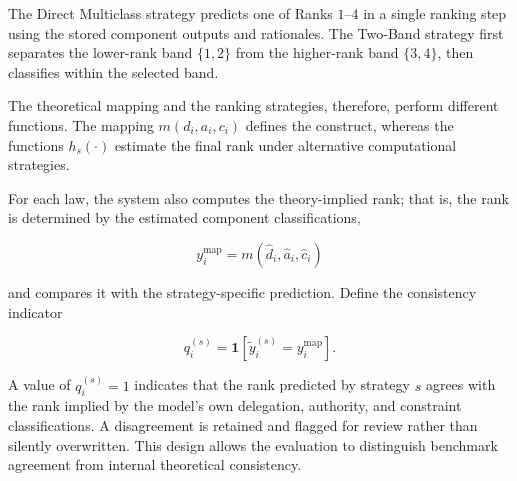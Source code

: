 The Direct Multiclass strategy predicts one of Ranks \(1\)--\(4\) in
a single ranking step using the stored component outputs and
rationales. The Two-Band strategy first separates the lower-rank band
\(\{1,2\}\) from the higher-rank band \(\{3,4\}\), then classifies
within the selected band.

The theoretical mapping and the ranking strategies, therefore, perform
different functions. The mapping \(m(d_i,a_i,c_i)\) defines the
construct, whereas the functions \(h_s(\cdot)\) estimate the final
rank under alternative computational strategies.

For each law, the system also computes the theory-implied rank; that is, the rank is determined by the estimated component classifications,

\[
y_i^{\mathrm{map}}
=
m(\hat d_i,\hat a_i,\hat c_i)
\]

and compares it with the strategy-specific prediction. Define the
consistency indicator

\[
q_i^{(s)}
=
\mathbf{1}
\left[
\tilde y_i^{(s)}
=
y_i^{\mathrm{map}}
\right].
\]

A value of \(q_i^{(s)}=1\) indicates that the rank predicted by
strategy \(s\) agrees with the rank implied by the model's own
delegation, authority, and constraint classifications. A disagreement
is retained and flagged for review rather than silently overwritten.
This design allows the evaluation to distinguish benchmark agreement
from internal theoretical consistency.



